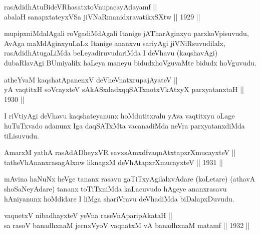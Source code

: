 \begin{shl}
rasAdidhAtuBideVRhasatxtoV\s nupacayAdayamf || \\
abalaH sanapxtateyxVSa jiVNaRmanidxravatikxSXtw \hfill || 1929 ||
  
\end{shl}

\begin{artha}
mupipxniMdalAgali roVgadiMdAgali Itanige jATharAginxyu
parxkoVpisuvudu, AvAga maMdAginxyuLaLx Itanige ananxvu sariyAgi
jiVNiRsuvudilalx, rasAdidhAtugaLiMda beLeyadiruvudariMda I deVhavu
(kaqshavAgi) dubaRlavAgi BUmiyalilx haLeya maneyu bidudxhoVguvaMte
bidudx hoVguvudu.
\end{artha}


\begin{shl}
atheYvaM kaqshatApanenxV deVheV\s natxrupajAyateV ||  \\
yA vaqtitxH soVcayxteV sAkASxdadxqqSATxnotxVkAtxyX parxyatanxtaH \hfill || 1930 ||
  
\end{shl}

\begin{artha}
I riVtiyAgi deVhavu kaqshateyanunx hoMdutitxralu yAva vaqtitxyu oLage
huTuTxvado adanunx Iga daqSATxMta vacanadiMda neVra parxyatanxdiMda
tiLisuvudu.
\end{artha}

\begin{shl}
AmarxM yathA rasAdADheyxVR savxsAmxdfvaqnAtxtapxrXmucayxteV || \\
tatheVhAnanxrasagAlxnw liknagxM deVhAtapxrXmucayxteV \hfill || 1931 ||
  
\end{shl}

\begin{artha}
mAvina haNuNx heVge tananx rasavu gaTiTxyAgilalxvAdare (koLetare)
(athavA shoSaNeyAdare) tananx toTiTxniMda kaLacuvudo hAgeye
ananxrasavu hAniyanunx hoMdidare I liMga shariVravu deVhadiMda
biDalapxDuvudu.
\end{artha}


\begin{shl}
vaqnetxV nibadhayxteV yeVna raseVnA\s \s paripAkataH ||  \\
sa rasoV banadhxnaM jecnxVyoV vaqnatxM vA banadhxnaM matamf \hfill || 1932 ||
 
\end{shl}


